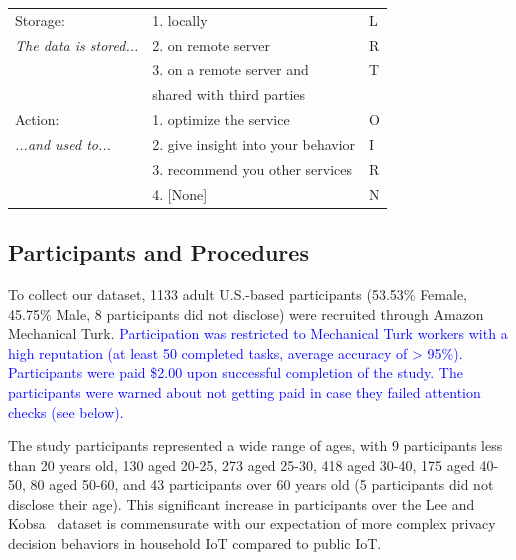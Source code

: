 \begin{table}
\begin{tabular} {l|l|l}
		Storage:  & 1. locally	& L\\
		\emph{The data is stored...} & 2. on remote server & R						\\
		& 3. on a remote server and & T\\
		& shared with third parties &\\\hline
		Action: & 1. optimize the service & O \\
		\emph{...and used to... } & 2. give insight into your behavior& I \\
		& 3. recommend you other services & R\\
		& 4. [None] & N\\ \hline
	\end{tabular}
\end{table}

\subsection{Participants and Procedures}
To collect our dataset, 1133 adult U.S.-based participants (53.53\% Female, 45.75\% Male, 8 participants did not disclose) were recruited through Amazon Mechanical Turk. \textcolor{blue}{Participation was restricted to Mechanical Turk workers with a high reputation (at least 50 completed tasks, average accuracy of > 95\%). Participants were paid \$2.00 upon successful completion of the study. The participants were warned about not getting paid in case they failed attention checks (see below).} 

The study participants represented a wide range of ages, with 9 participants less than 20 years old, 130 aged 20-25, 273 aged 25-30, 418 aged 30-40, 175 aged 40-50, 80 aged 50-60, and 43 participants over 60 years old (5 participants did not disclose their age). This significant increase in participants over the Lee and Kobsa~\cite{lee2016understanding} dataset is commensurate with our expectation of more complex privacy decision behaviors in household IoT compared to public IoT.

